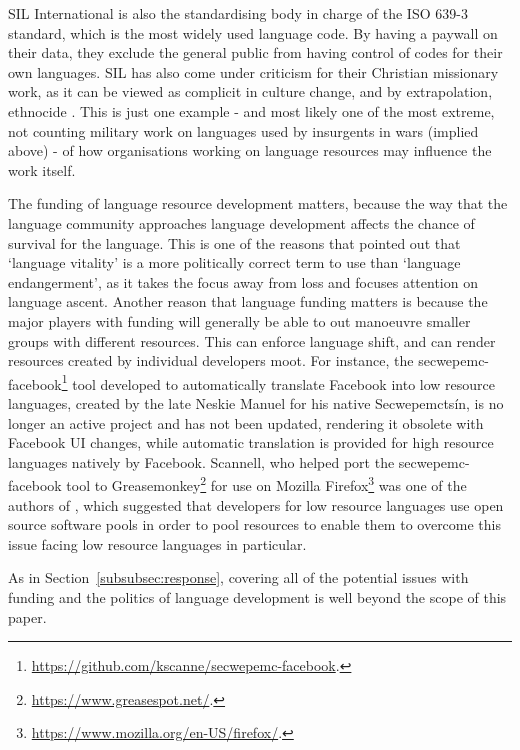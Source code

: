 SIL International is also the standardising body in charge of the ISO 639-3 standard, which is the most widely used language code. By having a paywall on their data, they exclude the general public from having control of codes for their own languages. SIL has also come under criticism for their Christian missionary work, as it can be viewed as complicit in culture change, and by extrapolation, ethnocide \citep{dobrin2009sil, dobrin2009practical, everett2009don}. This is just one example - and most likely one of the most extreme, not counting military work on languages used by insurgents in wars (implied above) - of how organisations working on language resources may influence the work itself.

The funding of language resource development matters, because the way that the language community approaches language development affects the chance of survival for the language. This is one of the reasons that \citet{grenoble2016response} pointed out that `language vitality' is a more politically correct term to use than `language endangerment', as it takes the focus away from loss and focuses attention on language ascent. Another reason that language funding matters is because the major players with funding will generally be able to out manoeuvre smaller groups with different resources. This can enforce language shift, and can render resources created by individual developers moot. For instance, the secwepemc-facebook\footnote{\href{https://github.com/kscanne/secwepemc-facebook}{https://github.com/kscanne/secwepemc-facebook}. } tool developed to automatically translate Facebook into low resource languages, created by the late Neskie Manuel for his native Secwepemcts\'in, is no longer an active project and has not been updated, rendering it obsolete with Facebook UI changes, while automatic translation is provided for high resource languages natively by Facebook. Scannell, who helped port the secwepemc-facebook tool to Greasemonkey\footnote{\href{https://www.greasespot.net/}{https://www.greasespot.net/}. } for use on Mozilla Firefox\footnote{\href{https://www.mozilla.org/en-US/firefox/}{https://www.mozilla.org/en-US/firefox/}. } was one of the authors of \citet{streiter2006implementing}, which suggested that developers for low resource languages use open source software pools in order to pool resources to enable them to overcome this issue facing low resource languages in particular.

As in Section~\ref{subsubsec:response}, covering all of the potential issues with funding and the politics of language development is well beyond the scope of this paper.


